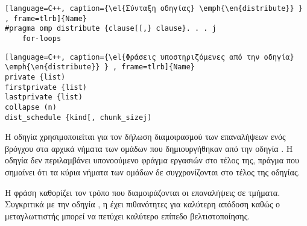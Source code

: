\begin{lstlisting}[language=C++, caption={\el{Σύνταξη οδηγίας} \emph{\en{distribute}} } , frame=tlrb]{Name}
#pragma omp distribute {clause[[,} clause}. . . j
	for-loops
\end{lstlisting}


\begin{lstlisting}[language=C++, caption={\el{Φράσεις υποστηριζόμενες από την οδηγία} \emph{\en{distribute}} } , frame=tlrb]{Name}
private {list)
firstprivate {list)
lastprivate {list)
collapse (n)
dist_schedule {kind[, chunk_sizej)
\end{lstlisting}
\clearpage

Η οδηγία \emph{} χρησιμοποιείται για τον δήλωση διαμοιρασμού των επαναλήψεων ενός βρόγχου στα αρχικά νήματα των ομάδων που δημιουργήθηκαν από την οδηγία \emph{}. Η οδηγία δεν περιλαμβάνει υπονοούμενο φράγμα εργασιών στο τέλος της, πράγμα που σημαίνει ότι τα κύρια νήματα των ομάδων δε συγχρονίζονται στο τέλος της οδηγίας.

Η φράση \emph{} καθορίζει τον τρόπο που διαμοιράζονται οι επαναλήψεις σε τμήματα. Συγκριτικά με την οδηγία \emph{}, η \emph{} έχει πιθανότητες για καλύτερη απόδοση καθώς ο μεταγλωττιστής μπορεί να πετύχει καλύτερο επίπεδο βελτιστοποίησης.



